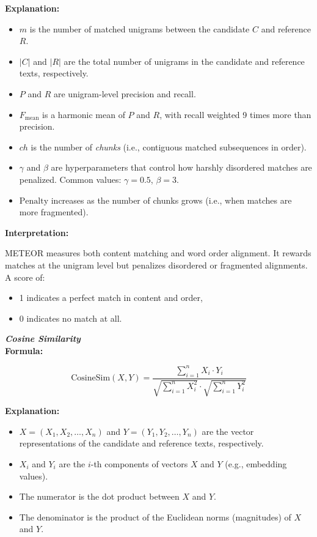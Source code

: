 \documentclass[conference]{IEEEtran}
\begin{document}
\textbf{Explanation:}
\begin{itemize}
  \item $m$ is the number of matched unigrams between the candidate $C$ and reference $R$.
  \item $|C|$ and $|R|$ are the total number of unigrams in the candidate and reference texts, respectively.
  \item $P$ and $R$ are unigram-level precision and recall.
  \item $F_{\text{mean}}$ is a harmonic mean of $P$ and $R$, with recall weighted 9 times more than precision.
  \item $ch$ is the number of \textit{chunks} (i.e., contiguous matched subsequences in order).
  \item $\gamma$ and $\beta$ are hyperparameters that control how harshly disordered matches are penalized. Common values: $\gamma = 0.5$, $\beta = 3$.
  \item $\text{Penalty}$ increases as the number of chunks grows (i.e., when matches are more fragmented).
\end{itemize}

\textbf{Interpretation:}

METEOR measures both content matching and word order alignment. It rewards matches at the unigram level but penalizes disordered or fragmented alignments. A score of:
\begin{itemize}
  \item 1 indicates a perfect match in content and order,
  \item 0 indicates no match at all.
\end{itemize}
\vspace{1em}
\noindent \textbf{\textit{Cosine Similarity}}\\

\textbf{Formula:}

\begin{equation}
\text{CosineSim}(X, Y) = \frac{\sum_{i=1}^{n} X_i \cdot Y_i}{\sqrt{\sum_{i=1}^{n} X_i^2} \cdot \sqrt{\sum_{i=1}^{n} Y_i^2}}
\end{equation}

\textbf{Explanation:}
\begin{itemize}
  \item $X = (X_1, X_2, \dots, X_n)$ and $Y = (Y_1, Y_2, \dots, Y_n)$ are the vector representations of the candidate and reference texts, respectively.
  \item $X_i$ and $Y_i$ are the $i$-th components of vectors $X$ and $Y$ (e.g., embedding values).
  \item The numerator is the dot product between $X$ and $Y$.
  \item The denominator is the product of the Euclidean norms (magnitudes) of $X$ and $Y$.
\end{itemize}
\end{document}

